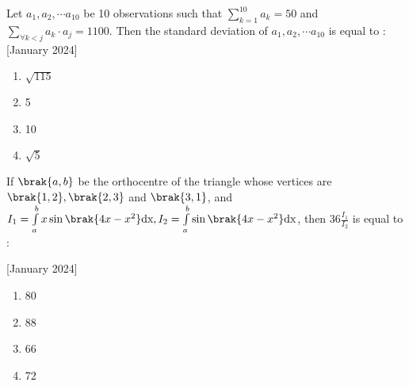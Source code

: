 \item Let $a_1, a_2, \cdots a_{10}$ be 10 observations such that  $\sum_{k=1}^{10} a_k=50$ and $\sum_{\forall k < j} a_k \cdot a_j = 1100$. Then the standard deviation of $a_1,a_2,\cdots a_{10}$ is equal to : \hfill{[January 2024]}
\begin{enumerate}
    \item $\sqrt{115}$
    \item 5
    \item 10
    \item $\sqrt{5}$
\end{enumerate}

\item If $\brak{a,b}$ be the orthocentre of the triangle whose vertices are $\brak{1,2}, \brak{2,3}$ and $\brak{3,1}$, and $I_1=\int\limits_a^b x\sin\brak{4x-x^2}\text{dx}, I_2=\int\limits_a^b \sin\brak{4x-x^2}\text{dx}$, then $36\frac{I_1}{I_2}$ is equal to :

    \hfill{[January 2024]}
\begin{enumerate}
    \item 80
    \item 88
    \item 66
    \item 72
\end{enumerate}

